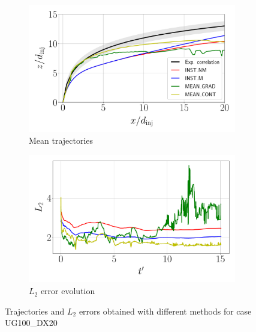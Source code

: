 \begin{figure}[ht]
\flushleft
\begin{subfigure}[b]{0.45\textwidth}
	\centering
   \includegraphics[scale=0.25]{./part2_developments/figures_ch5_resolved_JICF/results_trajectories/methods_comparison_trajectories_q6uG100_dx20.pdf}
   \caption{Mean trajectories}
\end{subfigure}
\hspace{0.25in}
\begin{subfigure}[b]{0.45\textwidth}
	\centering
   \includegraphics[scale=0.25]{./part2_developments/figures_ch5_resolved_JICF/results_trajectories/methods_comparison_L2_evolution_q6uG100_dx20.pdf}
   \caption{$L_2$ error evolution}
\end{subfigure}
\caption{Trajectories and $L_2$ errors obtained with different methods for case UG100\_DX20}
\label{fig:JICF_trajectories_and_L2_comparison}
\end{figure}

